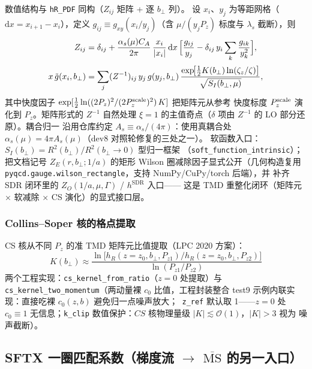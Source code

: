 \documentclass[11pt,a4paper]{ctexart}
\newcommand{\MSbarM}{\overline{\text{MS}}}
\newcommand{\abs}[1]{\lvert #1\rvert}
\newcommand{\order}[1]{\mathcal{O}(#1)}
\newcommand{\code}[1]{\texttt{#1}}
\newcommand{\pathref}[1]{\path{#1}}
\newcommand{\bperp}{b_{\perp}}
\begin{document}
数值结构与 \code{hR\_PDF} 同构（$Z_{ij}$ 矩阵 + 逐 $\bperp$ 列）。
设 $x_i$、$y_j$ 为等距网格（$\mathrm{d}x=x_{i+1}-x_i$），定义
$g_{ij}\equiv g_{xy}(x_i/y_j)$（含 $\mu/(y_jP_z)$ 标度与 $\lambda_s$
截断），则
\begin{align}
Z_{ij} &= \delta_{ij} + \frac{\alpha_s(\mu)C_A}{2\pi}\,
\frac{x_i}{\abs{x_i}}\,\mathrm{d}x\,
\Bigl[\frac{g_{ij}}{y_j}
-\delta_{ij}\,y_i\sum_k\frac{g_{ik}}{y_k^2}\Bigr],
\label{eq:zij-matrix}\\[2pt]
x\,\tilde g(x_i,\bperp) &=
\sum_j (Z^{-1})_{ij}\,
y_j\,g(y_j,\bperp)\,
\frac{\exp\!\bigl[\tfrac12 K(\bperp)\ln(\zeta_z/\zeta)\bigr]}
{\sqrt{S_I(\bperp,\mu)}},
\label{eq:tmd-conv}
\end{align}
其中快度因子
$\exp[\tfrac12\ln((2P_z)^2/(2P_z^{\rm scale})^2)\,K]$ 把矩阵元从参考
快度标度 $P_z^{\rm scale}$ 演化到 $P_z$。矩阵形式的 $Z^{-1}$ 自然处理
$\xi=1$ 的主值奇点（$\delta$ 项由 $Z^{-1}$ 的 LO 部分还原）。耦合归一
沿用仓库约定 $A_s\equiv\alpha_s/(4\pi)$：使用真耦合处
$\alpha_s(\mu)=4\pi A_s(\mu)$（dev8 对照轮修复的三处之一）。
软函数入口：$S_I(\bperp)=R^2(\bperp)/R^2(\bperp\to0)$ 型归一框架
（\code{soft\_function\_intrinsic}）；
\pathref{pyqcd/renorm/_soft.py} 把文档记号 $Z_E(r,\bperp;1/a)$ 的矩形
Wilson 圈减除因子显式公开（几何构造复用
\code{pyqcd.gauge.wilson\_rectangle}，支持 NumPy/CuPy/torch 后端），并
补齐 SDR 闭环里的 $Z_O(1/a,\mu,\Gamma)$ / $h^{\mathrm{SDR}}$ 入口——
这是 TMD 重整化闭环（矩阵元 × 软减除 × CS 演化）的显式接口层。

\subsubsection{Collins--Soper 核的格点提取}

CS 核从不同 $P_z$ 的准 TMD 矩阵元比值提取（LPC 2020 方案）：
\begin{equation}\label{eq:cs-kernel}
K(\bperp) \approx
\frac{\ln\bigl[h_R(z=z_0,\bperp,P_{z1})/h_R(z=z_0,\bperp,P_{z2})\bigr]}
{\ln(P_{z1}/P_{z2})}
\end{equation}
两个工程实现：\code{cs\_kernel\_from\_ratio}（$z=0$ 处提取）与
\code{cs\_kernel\_two\_momentum}（两动量裸 $c_0$ 比值，工程封装整合
test9 示例内联实现：直接吃裸 $c_0(z,b)$ 避免归一点噪声放大；\code{
z\_ref} 默认取 1——$z=0$ 处 $c_0\equiv1$ 无信息；\code{k\_clip}
数值保护：$CS$ 核物理量级 $\abs{K}\lesssim\order{1}$，$\abs{K}>3$ 视为
噪声截断）。

\subsection{SFTX 一圈匹配系数（梯度流 $\to$ $\MSbarM$ 的另一入口）}
\end{document}
